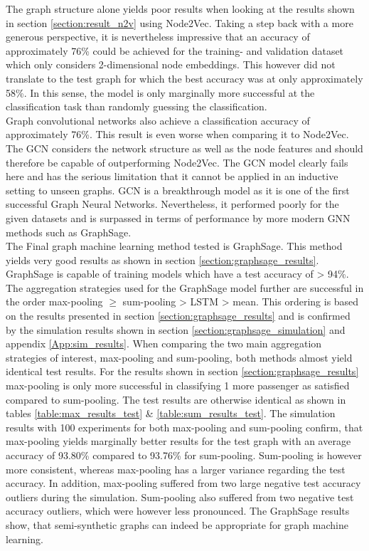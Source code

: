   \noindent The graph structure alone yields poor results when looking at the 
  results shown in section \ref{section:result_n2v} using Node2Vec. Taking a 
  step back with a more generous perspective, it is nevertheless impressive that 
  an accuracy of approximately 76\% could be achieved for the training- and 
  validation dataset which only considers 2-dimensional node embeddings. This 
  however did not translate to the test graph for which the best accuracy was at 
  only approximately 58\%. In this sense, the model is only marginally more 
  successful at the classification task than randomly guessing the 
  classification. \\

  \noindent Graph convolutional networks also achieve a classification 
  accuracy of approximately 76\%. This result is even worse when comparing it
  to Node2Vec. The GCN considers the network structure as well as the node 
  features and should therefore be capable of outperforming Node2Vec. The GCN 
  model clearly fails here and has the serious limitation that it cannot be 
  applied in an inductive setting to unseen graphs. GCN is a breakthrough model 
  as it is one of the first successful Graph Neural Networks. Nevertheless, it 
  performed poorly for the given datasets and is surpassed in terms of 
  performance by more modern GNN methods such as GraphSage. \\

  \noindent The Final graph machine learning method tested is GraphSage. This
  method yields very good results as shown in section 
  \ref{section:graphsage_results}. GraphSage is capable of training models
  which have a test accuracy of > 94\%. The aggregation strategies used for the
  GraphSage model further are successful in the order max-pooling $\geqslant$ 
  sum-pooling > LSTM > mean. This ordering is based on the results presented in 
  section \ref{section:graphsage_results} and is confirmed by the simulation 
  results shown in section \ref{section:graphsage_simulation} and appendix
  \ref{App:sim_results}. 
  When comparing the two main aggregation strategies of interest, max-pooling 
  and sum-pooling, both methods almost yield identical test results. For the
  results shown in section \ref{section:graphsage_results} max-pooling is only 
  more successful in classifying 1 more passenger as satisfied compared to
  sum-pooling. The test results are otherwise identical as shown in tables 
  \ref{table:max_results_test} \& \ref{table:sum_results_test}. The simulation
  results with 100 experiments for both max-pooling and sum-pooling confirm,
  that max-pooling yields marginally better results for the test graph with an
  average accuracy of 93.80\% compared to 93.76\% for sum-pooling. Sum-pooling
  is however more consistent, whereas max-pooling has a larger variance 
  regarding the test accuracy. In addition, max-pooling suffered from two large 
  negative test accuracy outliers during the simulation. Sum-pooling also 
  suffered from two negative test accuracy outliers, which were however less 
  pronounced. The GraphSage results show, that semi-synthetic graphs can indeed 
  be appropriate for graph machine learning.

